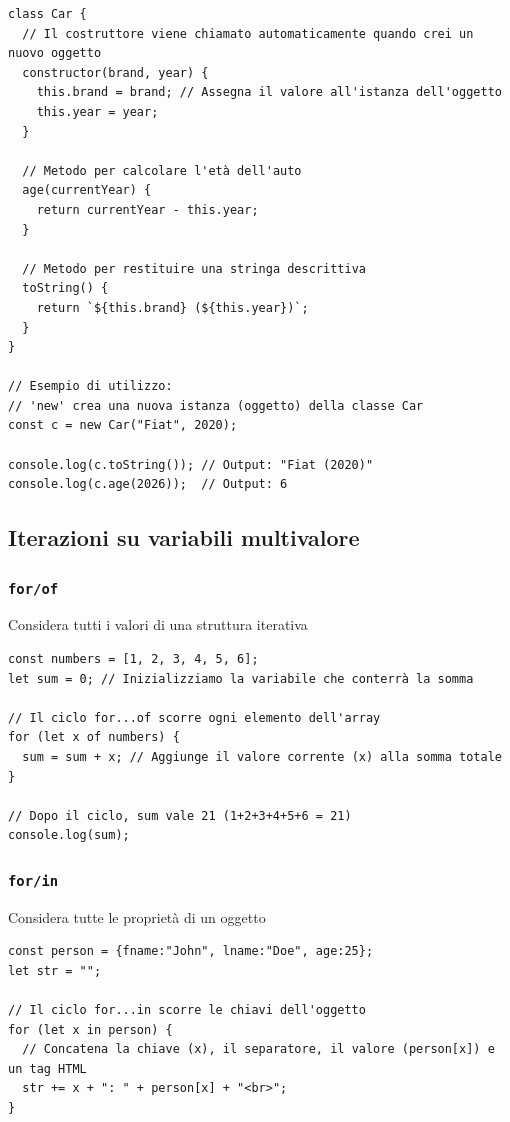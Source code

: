 \begin{tcolorbox}[title={Esempio di classe}, breakable]
\begin{lstlisting}
class Car {
  // Il costruttore viene chiamato automaticamente quando crei un nuovo oggetto
  constructor(brand, year) {
    this.brand = brand; // Assegna il valore all'istanza dell'oggetto
    this.year = year;
  }

  // Metodo per calcolare l'età dell'auto
  age(currentYear) {
    return currentYear - this.year;
  }

  // Metodo per restituire una stringa descrittiva
  toString() {
    return `${this.brand} (${this.year})`;
  }
}

// Esempio di utilizzo:
// 'new' crea una nuova istanza (oggetto) della classe Car
const c = new Car("Fiat", 2020);

console.log(c.toString()); // Output: "Fiat (2020)"
console.log(c.age(2026));  // Output: 6
\end{lstlisting}    
\end{tcolorbox}

\subsection{Iterazioni su variabili multivalore}
\subsubsection{\texttt{for/of}}
Considera tutti i valori di una struttura iterativa
\begin{lstlisting}
const numbers = [1, 2, 3, 4, 5, 6];
let sum = 0; // Inizializziamo la variabile che conterrà la somma

// Il ciclo for...of scorre ogni elemento dell'array
for (let x of numbers) {
  sum = sum + x; // Aggiunge il valore corrente (x) alla somma totale
}

// Dopo il ciclo, sum vale 21 (1+2+3+4+5+6 = 21)
console.log(sum);
\end{lstlisting}

\subsubsection{\texttt{for/in}}
Considera tutte le proprietà di un oggetto
\begin{lstlisting}
const person = {fname:"John", lname:"Doe", age:25};
let str = "";

// Il ciclo for...in scorre le chiavi dell'oggetto
for (let x in person) {
  // Concatena la chiave (x), il separatore, il valore (person[x]) e un tag HTML
  str += x + ": " + person[x] + "<br>";
}
\end{lstlisting}

